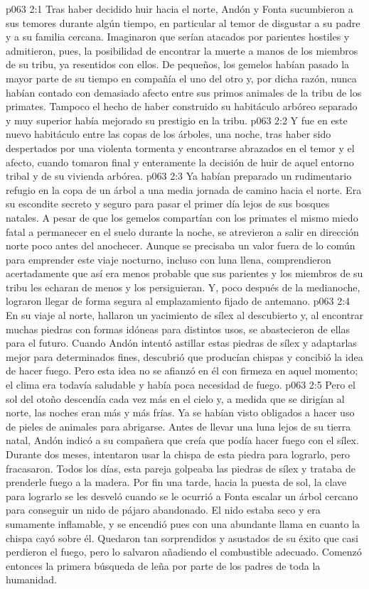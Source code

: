 \vs p063 2:1 Tras haber decidido huir hacia el norte, Andón y Fonta sucumbieron a sus temores durante algún tiempo, en particular al temor de disgustar a su padre y a su familia cercana. Imaginaron que serían atacados por parientes hostiles y admitieron, pues, la posibilidad de encontrar la muerte a manos de los miembros de su tribu, ya resentidos con ellos. De pequeños, los gemelos habían pasado la mayor parte de su tiempo en compañía el uno del otro y, por dicha razón, nunca habían contado con demasiado afecto entre sus primos animales de la tribu de los primates. Tampoco el hecho de haber construido su habitáculo arbóreo separado y muy superior había mejorado su prestigio en la tribu.
\vs p063 2:2 Y fue en este nuevo habitáculo entre las copas de los árboles, una noche, tras haber sido despertados por una violenta tormenta y encontrarse abrazados en el temor y el afecto, cuando tomaron final y enteramente la decisión de huir de aquel entorno tribal y de su vivienda arbórea.
\vs p063 2:3 Ya habían preparado un rudimentario refugio en la copa de un árbol a una media jornada de camino hacia el norte. Era su escondite secreto y seguro para pasar el primer día lejos de sus bosques natales. A pesar de que los gemelos compartían con los primates el mismo miedo fatal a permanecer en el suelo durante la noche, se atrevieron a salir en dirección norte poco antes del anochecer. Aunque se precisaba un valor fuera de lo común para emprender este viaje nocturno, incluso con luna llena, comprendieron acertadamente que así era menos probable que sus parientes y los miembros de su tribu les echaran de menos y los persiguieran. Y, poco después de la medianoche, lograron llegar de forma segura al emplazamiento fijado de antemano.
\vs p063 2:4 En su viaje al norte, hallaron un yacimiento de sílex al descubierto y, al encontrar muchas piedras con formas idóneas para distintos usos, se abastecieron de ellas para el futuro. Cuando Andón intentó astillar estas piedras de sílex y adaptarlas mejor para determinados fines, descubrió que producían chispas y concibió la idea de hacer fuego. Pero esta idea no se afianzó en él con firmeza en aquel momento; el clima era todavía saludable y había poca necesidad de fuego.
\vs p063 2:5 Pero el sol del otoño descendía cada vez más en el cielo y, a medida que se dirigían al norte, las noches eran más y más frías. Ya se habían visto obligados a hacer uso de pieles de animales para abrigarse. Antes de llevar una luna lejos de su tierra natal, Andón indicó a su compañera que creía que podía hacer fuego con el sílex. Durante dos meses, intentaron usar la chispa de esta piedra para lograrlo, pero fracasaron. Todos los días, esta pareja golpeaba las piedras de sílex y trataba de prenderle fuego a la madera. Por fin una tarde, hacia la puesta de sol, la clave para lograrlo se les desveló cuando se le ocurrió a Fonta escalar un árbol cercano para conseguir un nido de pájaro abandonado. El nido estaba seco y era sumamente inflamable, y se encendió pues con una abundante llama en cuanto la chispa cayó sobre él. Quedaron tan sorprendidos y asustados de su éxito que casi perdieron el fuego, pero lo salvaron añadiendo el combustible adecuado. Comenzó entonces la primera búsqueda de leña por parte de los padres de toda la humanidad.
